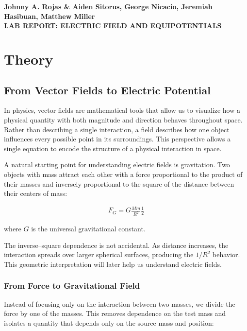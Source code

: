 \documentclass[12pt]{article}
\begin{document}
\begin{center}
    {\textbf{Johnny A. Rojas \& Aiden Sitorus, George Nicacio, Jeremiah
        Hasibuan, Matthew Miller}}\\
    {\Large \textbf{LAB REPORT: ELECTRIC FIELD AND EQUIPOTENTIALS}}
\end{center}

\section{Theory}
\subsection*{From Vector Fields to Electric Potential}

In physics, vector fields are mathematical tools that allow us to visualize how
a physical quantity with both magnitude and direction behaves throughout space.
Rather than describing a single interaction, a field describes how one object
influences every possible point in its surroundings. This perspective allows a
single equation to encode the structure of a physical interaction in space.

A natural starting point for understanding electric fields is gravitation.
Two objects with mass attract each other with a force proportional to the
product of their masses and inversely proportional to the square of the
distance between their centers of mass:

\begin{align*}
F_G = G \frac{M m}{R^2} \frac{1}{2}
\end{align*}

where $G$ is the universal gravitational constant.

The inverse–square dependence is not accidental. As distance increases,
the interaction spreads over larger spherical surfaces, producing the
$1/R^2$ behavior. This geometric interpretation will later help us understand
electric fields.

\subsubsection*{From Force to Gravitational Field}

Instead of focusing only on the interaction between two masses, we divide
the force by one of the masses. This removes dependence on the test mass
and isolates a quantity that depends only on the source mass and position:
\end{document}
